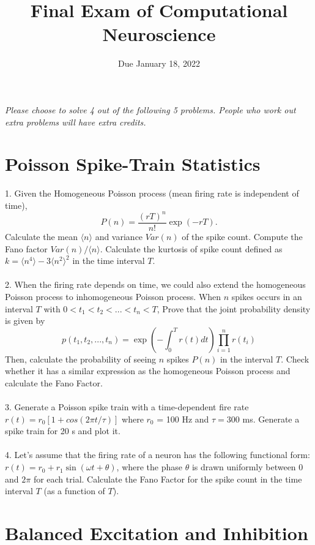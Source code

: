 \documentclass{article}
\title{Final Exam of Computational Neuroscience}
\date{Due January 18, 2022}
\begin{document}
\maketitle

\textit{Please choose to solve 4 out of the following 5 problems. People who work out extra problems will have extra credits.} 
\section*{Poisson Spike-Train Statistics}
1. Given the Homogeneous Poisson process (mean firing rate is independent of time), 
\begin{equation}
P(n)= \frac{(rT)^n}{n!}\exp(-rT).
\end{equation}
Calculate the mean $\langle n \rangle$ and variance $Var(n)$ of the spike count. Compute the Fano factor $Var(n)/\langle n \rangle$. 
Calculate the kurtosis of spike count defined as $k = \langle n^4 \rangle - 3 \langle n^2 \rangle^2$ in the time interval $T$. 
\\
\\
2. When the firing rate depends on time, we could also extend the homogeneous Poisson process to inhomogeneous Poisson process. When $n$ spikes occurs in an interval $T$ with $0<t_1<t_2<...<t_n<T$,  Prove that  the joint probability density is given by 
\begin{equation}
p(t_1,t_2,...,t_n)=\exp\left(-\int_0^Tr(t)dt\right)\prod_{i=1}^{n}r(t_i)
\end{equation}
Then, calculate the probability of seeing $n$ spikes $P(n)$ in the interval $T$. Check whether it has a similar expression as the homogeneous Poisson process and calculate the Fano Factor.
\\
\\
3. Generate a Poisson spike train with a time-dependent fire rate $r(t) = r_0[1 + cos(2\pi t/\tau)]$ where $r_0$ = 100 Hz and $\tau = 300$ ms. Generate a spike train for 20 s and plot it.
\\
\\
4. Let's assume that the firing rate of a neuron has the following functional form: $r(t)=r_0+r_1\sin(\omega t+\theta)$, where the phase $\theta$  is drawn uniformly between $0$ and $2\pi$ for each trial. Calculate the Fano Factor for the spike count in the time interval $T$ (as a function of $T$).

\section*{Balanced Excitation and Inhibition}
\end{document}
